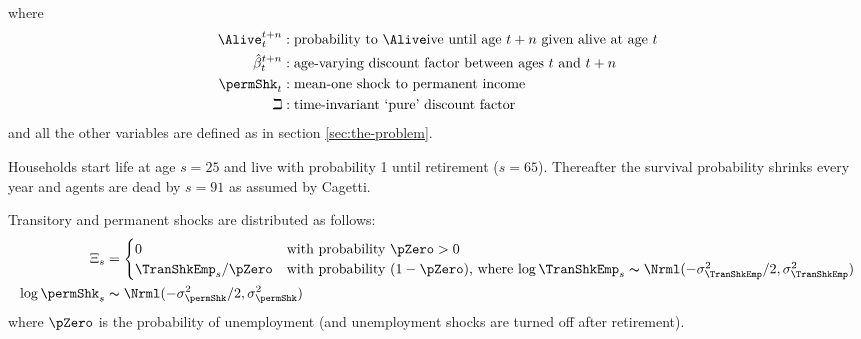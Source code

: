 where
  \begin{equation*}\begin{gathered}\begin{aligned}
        \Alive _{t}^{t+n} &:\text{probability to }\Alive\text{ive until age $t+n$ given alive at age $t$}
        \\      \hat{\beta}_{t}^{t+n} &:\text{age-varying discount factor between ages $t$ and $t+n$}
        \\     \permShk_{t} &:\text{mean-one shock to permanent income}
        \\     \beth &:\text{time-invariant `pure' discount factor}
      \end{aligned}\end{gathered}\end{equation*}
and all the other variables are defined as in section \ref{sec:the-problem}.

Households start life at age $s=25$ and live with probability 1 until retirement
($s=65$). Thereafter the survival probability shrinks every year and
agents are dead by $s=91$ as assumed by Cagetti. %

  Transitory and permanent shocks are distributed as follows:
  \begin{equation}\begin{gathered}\begin{aligned}
        \Xi_{s} & =
        \begin{cases}
          0\phantom{/\pZero} & \text{with probability $\pZero>0$} \\
          \TranShkEmp_{s}/\pZero      & \text{with probability $(1-\pZero)$, where $\log \TranShkEmp_{s}\thicksim \Nrml(-\sigma_{\TranShkEmp}^{2}/2,\sigma_{\TranShkEmp}^{2})$}\\
        \end{cases}\\
        \log \permShk_{s} &\thicksim \Nrml(-\sigma_{\permShk}^{2}/2,\sigma_{\permShk}^{2})
      \end{aligned}\end{gathered}\end{equation}
  where $\pZero$ is the probability of unemployment (and unemployment shocks are turned off after retirement).

